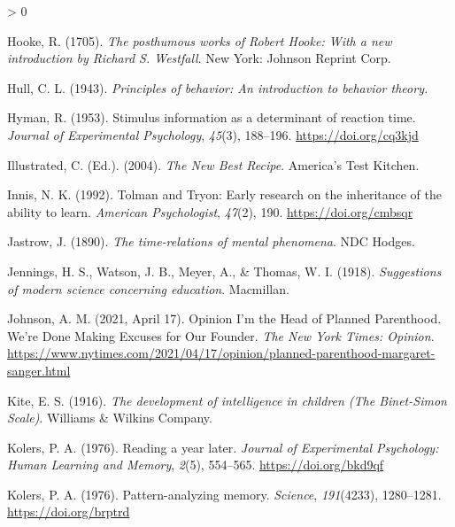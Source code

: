 \documentclass[
  oneside,
  12pt]{crumpbook}
\newlength{\cslhangindent}
\newenvironment{CSLReferences}[2] %
 {%
  \setlength{\parindent}{0pt}
  \ifodd #1 \everypar{\setlength{\hangindent}{\cslhangindent}}\ignorespaces\fi
  \ifnum #2 > 0
  \setlength{\parskip}{#2\baselineskip}
  \fi
 }%
 {}
\begin{document}
\begin{CSLReferences}{1}{0}
\leavevmode\hypertarget{ref-hookePosthumousWorksRobert1705}{}%
Hooke, R. (1705). \emph{The posthumous works of {Robert Hooke}: {With} a new introduction by {Richard S}. {Westfall}}. {New York: Johnson Reprint Corp}.

\leavevmode\hypertarget{ref-hullPrinciplesBehaviorIntroduction1943}{}%
Hull, C. L. (1943). \emph{Principles of behavior: {An} introduction to behavior theory.}

\leavevmode\hypertarget{ref-hymanStimulusInformationDeterminant1953}{}%
Hyman, R. (1953). Stimulus information as a determinant of reaction time. \emph{Journal of Experimental Psychology}, \emph{45}(3), 188--196. \url{https://doi.org/cq3kjd}

\leavevmode\hypertarget{ref-illustratedNewBestRecipe2004}{}%
Illustrated, C. (Ed.). (2004). \emph{The {New Best Recipe}}. {America's Test Kitchen}.

\leavevmode\hypertarget{ref-innisTolmanTryonEarly1992}{}%
Innis, N. K. (1992). Tolman and {Tryon}: {Early} research on the inheritance of the ability to learn. \emph{American Psychologist}, \emph{47}(2), 190. \url{https://doi.org/cmbsqr}

\leavevmode\hypertarget{ref-jastrowTimerelationsMentalPhenomena1890}{}%
Jastrow, J. (1890). \emph{The time-relations of mental phenomena}. {NDC Hodges}.

\leavevmode\hypertarget{ref-jenningsSuggestionsModernScience1918}{}%
Jennings, H. S., Watson, J. B., Meyer, A., \& Thomas, W. I. (1918). \emph{Suggestions of modern science concerning education}. {Macmillan}.

\leavevmode\hypertarget{ref-johnsonOpinionHeadPlanned2021}{}%
Johnson, A. M. (2021, April 17). Opinion \textbar{} {I}'m the {Head} of {Planned Parenthood}. {We}'re {Done Making Excuses} for {Our Founder}. \emph{The New York Times: Opinion}. \url{https://www.nytimes.com/2021/04/17/opinion/planned-parenthood-margaret-sanger.html}

\leavevmode\hypertarget{ref-kiteDevelopmentIntelligenceChildren1916}{}%
Kite, E. S. (1916). \emph{The development of intelligence in children ({The Binet}-{Simon Scale})}. {Williams \& Wilkins Company}.

\leavevmode\hypertarget{ref-kolersReadingYearLater1976}{}%
Kolers, P. A. (1976). Reading a year later. \emph{Journal of Experimental Psychology: Human Learning and Memory}, \emph{2}(5), 554--565. \url{https://doi.org/bkd9qf}

\leavevmode\hypertarget{ref-kolersPatternanalyzingMemory1976}{}%
Kolers, P. A. (1976). Pattern-analyzing memory. \emph{Science}, \emph{191}(4233), 1280--1281. \url{https://doi.org/brptrd}


\end{CSLReferences}
\end{document}
